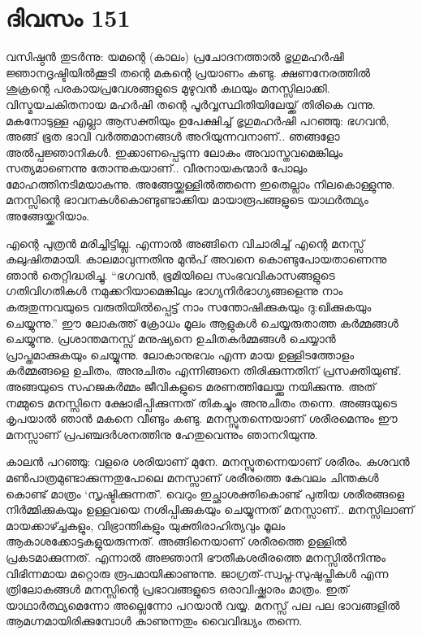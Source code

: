 \section{ദിവസം 151}


വസിഷ്ഠൻ തുടർന്നു: യമന്റെ (കാലം) പ്രചോദനത്താൽ ഭൃഗുമഹർഷി ജ്ഞാനദൃഷ്ടിയിൽക്കൂടി  തന്റെ മകന്റെ പ്രയാണം കണ്ടു. ക്ഷണനേരത്തിൽ ശുക്രന്റെ പരകായപ്രവേശങ്ങളുടെ മുഴുവൻ കഥയും മനസ്സിലാക്കി. വിസ്മയചകിതനായ മഹർഷി തന്റെ പൂര്‍വ്വസ്ഥിതിയിലേയ്ക്ക് തിരികെ വന്നു. മകനോടുള്ള എല്ലാ ആസക്തിയും ഉപേക്ഷിച്ച് ഭൃഗുമഹര്‍ഷി  പറഞ്ഞു: ഭഗവൻ, അങ്ങ് ഭൂത ഭാവി വർത്തമാനങ്ങൾ അറിയുന്നവനാണ്‌.. ഞങ്ങളോ അൽപ്പജ്ഞാനികൾ. ഇക്കാണപ്പെടുന്ന ലോകം അവാസ്തവമെങ്കിലും സത്യമാണെന്നു തോന്നുകയാണ്‌.. വീരനായകന്മാർ പോലും മോഹത്തിനടിമയാകുന്നു. അങ്ങേയ്ക്കുള്ളിൽത്തന്നെ ഇതെല്ലാം നിലകൊള്ളുന്നു. മനസ്സിന്റെ ഭാവനകൾകൊണ്ടുണ്ടാക്കിയ മായാരൂപങ്ങളുടെ യാഥർത്ഥ്യം അങ്ങേയ്ക്കറിയാം.

എന്റെ പുത്രൻ മരിച്ചിട്ടില്ല. എന്നാൽ അങ്ങിനെ വിചാരിച്ച് എന്റെ മനസ്സ് കലുഷിതമായി. കാലമാവുന്നതിനു മുൻപ് അവനെ കൊണ്ടുപോയതാണെന്നു ഞാൻ തെറ്റിദ്ധരിച്ചു. “ഭഗവൻ, ഭൂമിയിലെ സംഭവവികാസങ്ങളുടെ ഗതിവിഗതികൾ നമുക്കറിയാമെങ്കിലും ഭാഗ്യനിർഭാഗ്യങ്ങളെന്നു നാം കരുതുന്നവയുടെ വരുതിയിൽപ്പെട്ട് നാം സന്തോഷിക്കുകയും ദു:ഖിക്കുകയും ചെയ്യുന്നു.” ഈ ലോകത്ത് ക്രോധം മൂലം ആളുകൾ ചെയ്യരുതാത്ത കർമ്മങ്ങൾ ചെയ്യുന്നു. പ്രശാന്തമനസ്സ് മനുഷ്യനെ ഉചിതകർമ്മങ്ങൾ ചെയ്യാൻ പ്രാപ്തമാക്കുകയും ചെയ്യുന്നു. ലോകാനുഭവം എന്ന മായ ഉള്ളിടത്തോളം കർമ്മങ്ങളെ ഉചിതം, അനുചിതം എന്നിങ്ങനെ തിരിക്കുന്നതിന്‌ പ്രസക്തിയുണ്ട്. അങ്ങയുടെ സഹജകർമ്മം ജീവികളുടെ മരണത്തിലേയ്ക്കു നയിക്കുന്നു. അത് നമ്മുടെ മനസ്സിനെ ക്ഷോഭിപ്പിക്കുന്നത് തികച്ചും അനുചിതം തന്നെ. അങ്ങയുടെ കൃപയാൽ ഞാൻ മകനെ വീണ്ടും കണ്ടു. മനസ്സുതന്നെയാണ്‌ ശരീരമെന്നും ഈ മനസ്സാണ്‌ പ്രപഞ്ചദർശനത്തിനു ഹേതുവെന്നും ഞാനറിയുന്നു.

കാലന്‍ പറഞ്ഞു: വളരെ ശരിയാണ്‌ മുനേ. മനസ്സുതന്നെയാണ്‌ ശരീരം. കുശവൻ മൺപാത്രമുണ്ടാക്കുന്നതുപോലെ മനസ്സാണ്‌ ശരീരത്തെ കേവലം ചിന്തകൾ കൊണ്ട് മാത്രം ‘സൃഷ്ടിക്കുന്നത്’. വെറും ഇച്ഛാശക്തികൊണ്ട് പുതിയ ശരീരങ്ങളെ നിർമ്മിക്കുകയും ഉള്ളവയെ നശിപ്പിക്കുകയും ചെയ്യുന്നത് മനസ്സാണ്‌.. മനസ്സിലാണ്‌ മായക്കാഴ്ച്ചകളും, വിഭ്രാന്തികളും യുക്തിരാഹിത്യവും മൂലം ആകാശക്കോട്ടകളുയരുന്നത്. അങ്ങിനെയാണ്‌ ശരീരത്തെ ഉള്ളിൽ പ്രകടമാക്കുന്നത്. എന്നാൽ അജ്ഞാനി ഭൗതീകശരീരത്തെ മനസ്സിൽനിന്നും വിഭിന്നമായ മറ്റൊരു രൂപമായിക്കാണുന്നു. ജാഗ്രത്-സ്വപ്ന-സുഷുപ്തികൾ എന്ന ത്രിലോകങ്ങൾ മനസ്സിന്റെ പ്രഭാവങ്ങളുടെ  ഒരാവിഷ്ക്കാരം മാത്രം. ഇത് യാഥാർത്ഥ്യമെന്നോ അല്ലെന്നോ പറയാൻ വയ്യ. മനസ്സ് പല പല ഭാവങ്ങളില്‍ ആമഗ്നമായിരിക്കുമ്പോൾ കാണുന്നതും  വൈവിദ്ധ്യം തന്നെ. 

